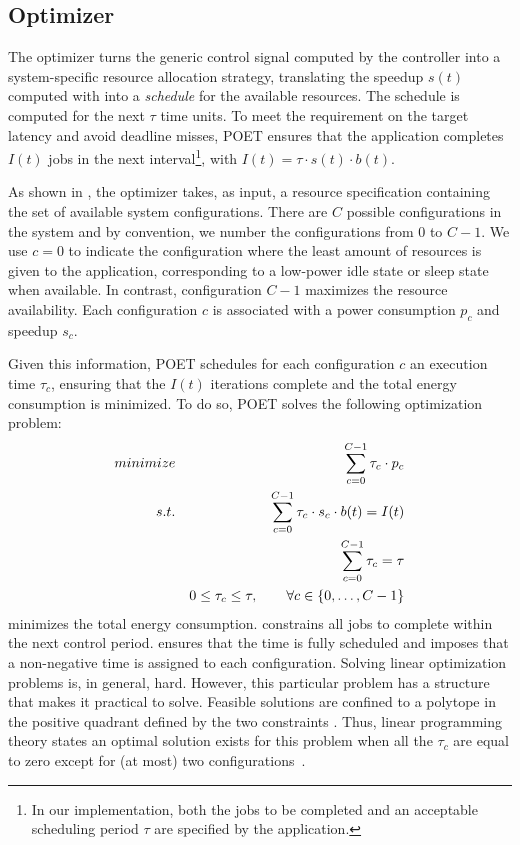 \subsection{Optimizer}
\label{sec:optimizer}

The optimizer turns the generic control signal computed by the controller into a system-specific resource allocation strategy, translating the speedup $s(t)$ computed with  into a \emph{schedule} for the available resources.
The schedule is computed for the next $\tau$ time units.
To meet the requirement on the target latency and avoid deadline misses, POET ensures that the application completes $I(t)$ jobs in the next interval\footnote{In our implementation, both the jobs to be completed and an acceptable scheduling period $\tau$ are specified by the application.}, with $I(t) = \tau \cdot s(t) \cdot b(t)$.

As shown in , the optimizer takes, as input, a resource specification containing the set of available system configurations.
There are $C$ possible configurations in the system and by convention, we number the configurations from $0$ to $C-1$.
We use $c = 0$ to indicate the configuration where the least amount of resources is given to the application, corresponding to a low-power idle state or sleep state when available.
In contrast, configuration $C-1$ maximizes the resource availability.
Each configuration $c$ is associated with a power consumption $p_c$ and speedup $s_c$.

Given this information, POET schedules for each configuration $c$ an execution time $\tau_c$, ensuring that the $I(t)$ iterations complete and the total energy consumption is minimized. To do so, POET solves the following optimization problem:
\begin{eqnarray}
\minimize && \sum_{c=0}^{C-1} \tau_c \cdot p_c \label{eqn:poet-power} \\
\st %
&& \sum_{c=0}^{C-1} \tau_c \cdot s_c \cdot b(t) =  I(t) \label{eqn:poet-work} \\
&& \sum_{c=0}^{C-1} \tau_c =  \tau \label{eqn:poet-deadline} \\
&& 0 \le \tau_c \le \tau, \qquad \forall c \in \{0,\ldots,C-1\} \label{eqn:poet-time}
\end{eqnarray}
 minimizes the total energy consumption.
 constrains all jobs to complete within the next control period.
 ensures that the time is fully scheduled and  imposes that a non-negative time is assigned to each configuration.
Solving linear optimization problems is, in general, hard.
However, this particular problem has a structure that makes it practical to solve.
Feasible solutions are confined to a polytope in the positive quadrant defined by the two constraints .
Thus, linear programming theory states an optimal solution exists for this problem when all the $\tau_c$ are equal to zero except for (at most) two configurations~\cite{LP}.

